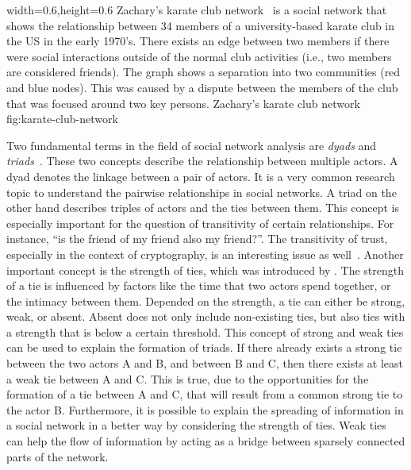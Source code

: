       {width=0.6\textwidth,height=0.6\textheight}
      {Zachary's karate club network~\cite{Zachary1977} is a social network that shows the relationship between 34 members of a university-based karate club in the US in the early 1970's.
      There exists an edge between two members if there were social interactions outside of the normal club activities (i.e., two members are considered friends).
      The graph shows a separation into two communities (red and blue nodes). This was caused by a dispute between the members of the club that was focused around two key persons.}
      {Zachary's karate club network}
      {fig:karate-club-network}

Two fundamental terms in the field of social network analysis are \emph{dyads} and \emph{triads}~\cite{Wasserman1994}.
These two concepts describe the relationship between multiple actors.
A dyad denotes the linkage between a pair of actors.
It is a very common research topic to understand the pairwise relationships in social networks.
A triad on the other hand describes triples of actors and the ties between them.
This concept is especially important for the question of transitivity of certain relationships.
For instance, \enquote{is the friend of my friend also my friend?}.
The transitivity of trust, especially in the context of cryptography, is an interesting issue as well~\cite{Christianson1997}.
Another important concept is the strength of ties, which was introduced by \citet{Granovetter1973}.
The strength of a tie is influenced by factors like the time that two actors spend together, or the intimacy between them.
Depended on the strength, a tie can either be strong, weak, or absent.
Absent does not only include non-existing ties, but also ties with a strength that is below a certain threshold.
This concept of strong and weak ties can be used to explain the formation of triads.
If there already exists a strong tie between the two actors A and B, and between B and C, then there exists at least a weak tie between A and C.
This is true, due to the opportunities for the formation of a tie between A and C, that will result from a common strong tie to the actor B.
Furthermore, it is possible to explain the spreading of information in a social network in a better way by considering the strength of ties.
Weak ties can help the flow of information by acting as a bridge between sparsely connected parts of the network.

